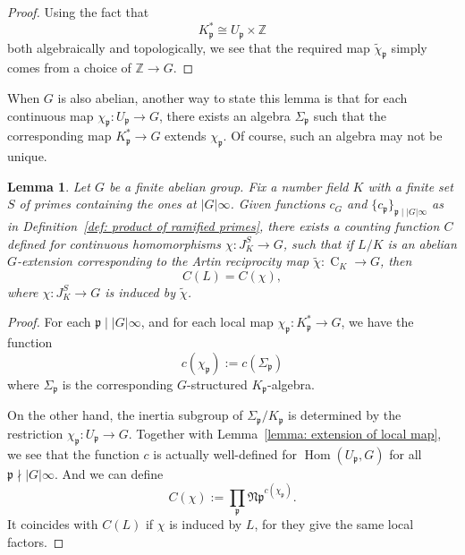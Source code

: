 \documentclass{amsart}
\numberwithin{equation}{section}
\theoremstyle{plain}
\newtheorem{lemma}[theorem]{Lemma}
\theoremstyle{definition}
\theoremstyle{remark}
\begin{document}
\begin{proof}
	Using the fact that
	\begin{equation*}
		K_{\mathfrak{p}}^*\cong U_{\mathfrak{p}}\times\mathbb{Z}
	\end{equation*}
	both algebraically and topologically, we see that the required map $\tilde{\chi}_{\mathfrak{p}}$ simply comes from a choice of $\mathbb{Z}\to G$.
\end{proof}
When $G$ is also abelian, another way to state this lemma is that for each continuous map $\chi_{\mathfrak{p}}:U_{\mathfrak{p}}\to G$, there exists an algebra $\Sigma_{\mathfrak{p}}$ such that the corresponding map $K_{\mathfrak{p}}^*\to G$ extends $\chi_{\mathfrak{p}}$.
Of course, such an algebra may not be unique.
\begin{lemma}\label{lemma: product of ramified primes}
    Let $G$ be a finite abelian group.
    Fix a number field $K$ with a finite set $S$ of primes containing the ones at $\lvert G\rvert\infty$.
    Given functions $c_G$ and $\{c_{\mathfrak{p}}\}_{\mathfrak{p}\mid\lvert G\rvert\infty}$ as in Definition~\ref{def: product of ramified primes}, there exists a counting function $C$ defined for continuous homomorphisms $\chi:J_K^S\to G$, such that if $L/K$ is an abelian $G$-extension corresponding to the Artin reciprocity map $\tilde{\chi}:\operatorname{C}_K\to G$, then
	\begin{equation*}
		C(L)=C(\chi),
	\end{equation*}
	where $\chi:J_K^S\to G$ is induced by $\tilde{\chi}$.
\end{lemma}
\begin{proof}
	For each $\mathfrak{p}\mid\lvert G\rvert\infty$, and for each local map $\chi_{\mathfrak{p}}:K_{\mathfrak{p}}^*\to G$, we have the function
	\begin{equation*}
		c(\chi_{\mathfrak{p}}):=c(\Sigma_{\mathfrak{p}})
	\end{equation*}
	where $\Sigma_{\mathfrak{p}}$ is the corresponding $G$-structured $K_{\mathfrak{p}}$-algebra.
	
	On the other hand, the inertia subgroup of $\Sigma_{\mathfrak{p}}/K_{\mathfrak{p}}$ is determined by the restriction $\chi_{\mathfrak{p}}:U_{\mathfrak{p}}\to G$.
        Together with Lemma~\ref{lemma: extension of local map}, we see that the function $c$ is actually well-defined for $\operatorname{Hom}(U_{\mathfrak{p}},G)$ for all $\mathfrak{p}\nmid\lvert G\rvert\infty$.
	And we can define
	\begin{equation*}
		C(\chi):=\prod_{\mathfrak{p}}\mathfrak{Np}^{c(\chi_{\mathfrak{p}})}.
	\end{equation*}
	It coincides with $C(L)$ if $\chi$ is induced by $L$, for they give the same local factors.
\end{proof}
\end{document}

